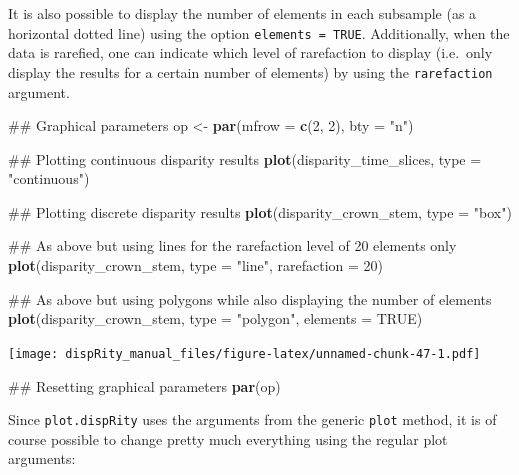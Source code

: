 \documentclass[]{book}
\newenvironment{Shaded}{\begin{snugshade}}{\end{snugshade}}
\newcommand{\KeywordTok}[1]{\textcolor[rgb]{0.13,0.29,0.53}{\textbf{#1}}}
\newcommand{\DataTypeTok}[1]{\textcolor[rgb]{0.13,0.29,0.53}{#1}}
\newcommand{\DecValTok}[1]{\textcolor[rgb]{0.00,0.00,0.81}{#1}}
\newcommand{\StringTok}[1]{\textcolor[rgb]{0.31,0.60,0.02}{#1}}
\newcommand{\OtherTok}[1]{\textcolor[rgb]{0.56,0.35,0.01}{#1}}
\newcommand{\NormalTok}[1]{#1}
\theoremstyle{definition}
\theoremstyle{definition}
\theoremstyle{remark}
\begin{document}
It is also possible to display the number of elements in each subsample
(as a horizontal dotted line) using the option
\texttt{elements\ =\ TRUE}. Additionally, when the data is rarefied, one
can indicate which level of rarefaction to display (i.e.~only display
the results for a certain number of elements) by using the
\texttt{rarefaction} argument.

\begin{Shaded}
\begin{Highlighting}[]
\NormalTok{## Graphical parameters}
\NormalTok{op <-}\StringTok{ }\KeywordTok{par}\NormalTok{(}\DataTypeTok{mfrow =} \KeywordTok{c}\NormalTok{(}\DecValTok{2}\NormalTok{, }\DecValTok{2}\NormalTok{), }\DataTypeTok{bty =} \StringTok{"n"}\NormalTok{)}

\NormalTok{## Plotting continuous disparity results}
\KeywordTok{plot}\NormalTok{(disparity_time_slices, }\DataTypeTok{type =} \StringTok{"continuous"}\NormalTok{)}

\NormalTok{## Plotting discrete disparity results}
\KeywordTok{plot}\NormalTok{(disparity_crown_stem, }\DataTypeTok{type =} \StringTok{"box"}\NormalTok{)}

\NormalTok{## As above but using lines for the rarefaction level of 20 elements only}
\KeywordTok{plot}\NormalTok{(disparity_crown_stem, }\DataTypeTok{type =} \StringTok{"line"}\NormalTok{, }\DataTypeTok{rarefaction =} \DecValTok{20}\NormalTok{)}

\NormalTok{## As above but using polygons while also displaying the number of elements}
\KeywordTok{plot}\NormalTok{(disparity_crown_stem, }\DataTypeTok{type =} \StringTok{"polygon"}\NormalTok{, }\DataTypeTok{elements =} \OtherTok{TRUE}\NormalTok{)}
\end{Highlighting}
\end{Shaded}

\texttt{[image: dispRity\_manual\_files/figure-latex/unnamed-chunk-47-1.pdf]}

\begin{Shaded}
\begin{Highlighting}[]
\NormalTok{## Resetting graphical parameters}
\KeywordTok{par}\NormalTok{(op)}
\end{Highlighting}
\end{Shaded}

Since \texttt{plot.dispRity} uses the arguments from the generic
\texttt{plot} method, it is of course possible to change pretty much
everything using the regular plot arguments:
\end{document}
